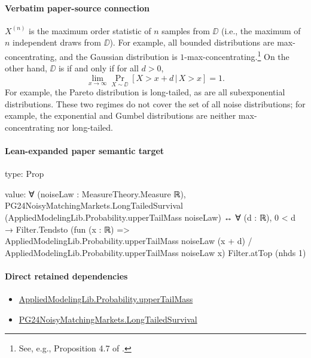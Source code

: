 \documentclass[10pt]{article}
\begin{document}
\paragraph{Verbatim paper-source connection}
\begin{ReviewVerbatim}
$X^{(n)}$ is the maximum order statistic of $n$ samples from $\DD$ (i.e., the maximum of $n$ independent draws from $\DD$). For example, all bounded distributions are max-concentrating, and the Gaussian distribution is $1$-max-concentrating.\footnote{See, e.g., Proposition 4.7 of \cite{boucheron2012concentration}.} On the other hand, $\DD$ is  if and only if for all $d > 0$,
\begin{equation}
    \lim_{x\rightarrow \infty} \Pr_{X\sim \DD}[X > x + d\,|\,X > x] = 1.
\end{equation}
For example, the Pareto distribution is long-tailed, as are all subexponential distributions. These two regimes do not cover the set of all noise distributions; for example, the exponential and Gumbel distributions are neither max-concentrating nor long-tailed.
\end{ReviewVerbatim}



\paragraph{Lean-expanded paper semantic target}
\begin{ReviewVerbatim}
type:
Prop

value:
∀ (noiseLaw : MeasureTheory.Measure ℝ),
  PG24NoisyMatchingMarkets.LongTailedSurvival (AppliedModelingLib.Probability.upperTailMass noiseLaw) ↔
    ∀ (d : ℝ),
      0 < d →
        Filter.Tendsto
          (fun (x : ℝ) =>
            AppliedModelingLib.Probability.upperTailMass noiseLaw (x + d) /
              AppliedModelingLib.Probability.upperTailMass noiseLaw x)
          Filter.atTop (nhds 1)
\end{ReviewVerbatim}

\paragraph{Direct retained dependencies}
\begin{itemize}\raggedright
\item \hyperlink{governing-declaration-f983ca9c59dc317f}{Applied\allowbreak{}Modeling\allowbreak{}Lib.\allowbreak{}Probability.\allowbreak{}upper\allowbreak{}Tail\allowbreak{}Mass}
\item \hyperlink{governing-declaration-e6c10c02961c0451}{PG24\allowbreak{}Noisy\allowbreak{}Matching\allowbreak{}Markets.\allowbreak{}Long\allowbreak{}Tailed\allowbreak{}Survival}
\end{itemize}
\end{document}
